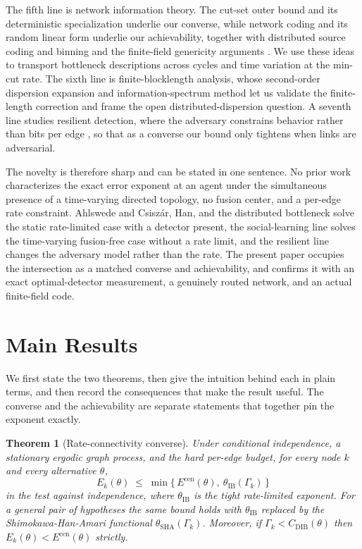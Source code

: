 \documentclass[journal]{IEEEtran}
\newtheorem{theorem}{Theorem}
\theoremstyle{definition}
\theoremstyle{remark}
\newcommand{\Ecen}{E^{\mathrm{cen}}}
\newcommand{\tib}{\theta_{\mathrm{IB}}}
\newcommand{\tsha}{\theta_{\mathrm{SHA}}}
\newcommand{\Gk}{\Gamma_k}
\newcommand{\Cdib}{C_{\mathrm{DIB}}}
\begin{document}
The fifth line is network information theory. The cut-set outer bound and its deterministic specialization
\cite{coverthomas2006,coverelgamal1979,elgamalkim2011} underlie our converse, while network coding and its random
linear form \cite{aclY2000,liyeungcai2003,koettermedard2003,ho2006} underlie our achievability,
together with distributed source coding and binning \cite{slepianwolf1973,wynerziv1976,berger1978} and the
finite-field genericity arguments \cite{schwartz1980,zippel1979}. We use these ideas to transport
bottleneck descriptions across cycles and time variation at the min-cut rate. The sixth line is
finite-blocklength analysis, whose second-order dispersion expansion \cite{strassen1962,ppv2010} and
information-spectrum method \cite{han2003} let us validate the finite-length correction and frame the
open distributed-dispersion question. A seventh line studies resilient detection, where the adversary constrains
behavior rather than bits per edge \cite{vempaty2013}, so that as a converse our bound only tightens when links
are adversarial.

The novelty is therefore sharp and can be stated in one sentence. No prior work characterizes the exact error
exponent at an agent under the simultaneous presence of a time-varying directed topology, no fusion center, and a
per-edge rate constraint. Ahlswede and Csisz\'ar, Han, and the distributed bottleneck solve the static
rate-limited case with a detector present, the social-learning line solves the time-varying fusion-free case
without a rate limit, and the resilient line changes the adversary model rather than the rate. The present paper
occupies the intersection as a matched converse and achievability, and confirms it with an exact optimal-detector
measurement, a genuinely routed network, and an actual finite-field code.

\section{Main Results}\label{sec:results}
We first state the two theorems, then give the intuition behind each in plain terms, and then record the
consequences that make the result useful. The converse and the achievability are separate statements that
together pin the exponent exactly.

\begin{theorem}[Rate-connectivity converse]\label{thm:converse}
Under conditional independence, a stationary ergodic graph process, and the hard per-edge budget, for every node
$k$ and every alternative $\theta$,
\begin{equation}
E_k(\theta) \;\le\; \min\{\,\Ecen(\theta),\ \tib(\Gk)\,\} \label{eq:conv}
\end{equation}
in the test against independence, where $\tib$ is the tight rate-limited exponent. For a general pair of
hypotheses the same bound holds with $\tib$ replaced by the Shimokawa-Han-Amari functional $\tsha(\Gk)$. Moreover,
if $\Gk<\Cdib(\theta)$ then $E_k(\theta)<\Ecen(\theta)$ strictly.
\end{theorem}
\end{document}
